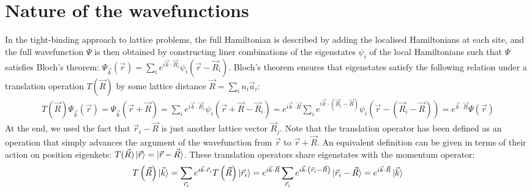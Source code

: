 \documentclass{report}
\numberwithin{equation}{section}
\begin{document}
\section{Nature of the wavefunctions}
In the tight-binding approach to lattice problems, the full Hamiltonian is described by adding the localised Hamiltonians at each site, and the full wavefunction \(\Psi\) is then obtained by constructing liner combinations of the eigenstates \(\psi_i\) of the local Hamiltonians such that \(\Psi\) satisfies Bloch's theorem: \(\Psi_{\vec k}(\vec r) = \sum_i e^{i \vec{k}\cdot\vec{R}_i} \psi_i(\vec r - \vec R_i)\). Bloch's theorem ensures that eigenstates satisfy the following relation under a translation operation \(T(\vec R)\) by some lattice distance \(\vec R = \sum_i n_i \vec a_i\):
\begin{equation}\begin{aligned}
T(\vec R)\Psi_{\vec k}\left(\vec r\right) = \Psi_{\vec k}(\vec r + \vec R) = \sum_i e^{i \vec{k}\cdot\vec{R}_i} \psi_i(\vec r + \vec R - \vec R_i) = e^{i \vec{k}\cdot\vec{R}}\sum_i e^{i \vec{k}\cdot\left(\vec{R}_i - \vec R\right)} \psi_i(\vec r - (\vec R_i - \vec R)) = e^{\vec{k}\cdot\vec{R}}\Psi(\vec r)
\end{aligned}\end{equation}
At the end, we used the fact that \(\vec r_i - \vec R\) is just another lattice vector \(\vec R_j\). Note that the translation operator has been defined as an operation that simply advances the argument of the wavefunction from \(\vec r\) to \(\vec r + \vec R\). An equivalent definition can be given in terms of their action on position eigenkets: \(T(\vec R)\ket{\vec r} = \ket{\vec r - \vec R}\). These translation operators share eigenstates with the momentum operator:
\begin{equation}\begin{aligned}
	T\left( \vec R \right) \ket{\vec k} = \sum_{\vec r_i} e^{i \vec{k}\cdot\vec{r}_i}T\left( \vec R \right)\ket{\vec r_i} = e^{i \vec{k}\cdot\vec{R}}\sum_{\vec r_i} e^{i \vec{k}\cdot\left(\vec{r}_i - \vec R\right)}\ket{\vec r_i - \vec R} = e^{i \vec{k}\cdot\vec{R}} \ket{\vec k}
\end{aligned}\end{equation}
\end{document}

